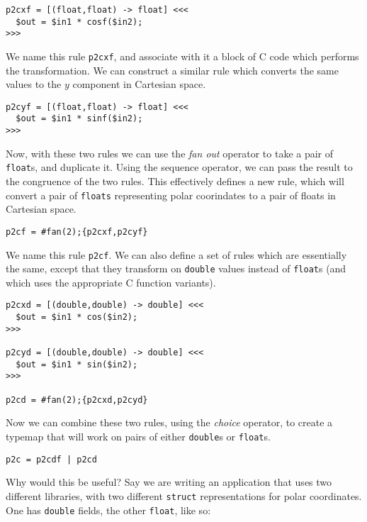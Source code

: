 \begin{verbatim}
p2cxf = [(float,float) -> float] <<<
  $out = $in1 * cosf($in2);
>>>
\end{verbatim}

We name this rule \texttt{p2cxf}, and associate with it a block of C code which performs the transformation. We can construct a similar rule which converts the same values to the $y$ component in Cartesian space.

\begin{verbatim}
p2cyf = [(float,float) -> float] <<<
  $out = $in1 * sinf($in2);
>>>
\end{verbatim}

Now, with these two rules we can use the \emph{fan out} operator to take a pair of \texttt{float}s, and duplicate it. Using the sequence operator, we can pass the result to the congruence of the two rules. This effectively defines a new rule, which will convert a pair of \texttt{floats} representing polar coorindates to a pair of floats in Cartesian space.

\begin{verbatim}
p2cf = #fan(2);{p2cxf,p2cyf}
\end{verbatim}

We name this rule \texttt{p2cf}. We can also define a set of  rules which are essentially the same, except that they transform on \texttt{double} values instead of \texttt{float}s (and which uses the appropriate C function variants).

\begin{verbatim}
p2cxd = [(double,double) -> double] <<<
  $out = $in1 * cos($in2);
>>>

p2cyd = [(double,double) -> double] <<<
  $out = $in1 * sin($in2);
>>>

p2cd = #fan(2);{p2cxd,p2cyd}
\end{verbatim}

Now we can combine these two rules, using the \emph{choice} operator, to create a typemap that will work on pairs of either  \texttt{double}s or \texttt{float}s.

\begin{verbatim}
p2c = p2cdf | p2cd
\end{verbatim}

Why would this be useful? Say we are writing an application that uses two different libraries, with two different \texttt{struct} representations for polar coordinates. One has \texttt{double} fields, the other \texttt{float}, like so:

